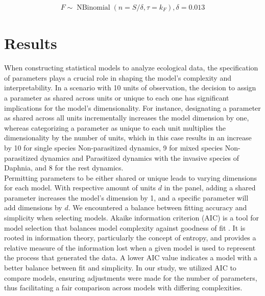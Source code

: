 \documentclass[12pt]{article}
\begin{document}
\begin{align}
F \sim \operatorname{NBinomial}(n=S / \delta, \tau = k_F), \delta=0.013 
\end{align}

\section{Results}
\label{sec:res}
When constructing statistical models to analyze ecological data, the specification of parameters plays a crucial role in shaping the model's complexity and interpretability. In a scenario with 10 units of observation, the decision to assign a parameter as shared across units or unique to each one has significant implications for the model's dimensionality. For instance, designating a parameter as shared across all units incrementally increases the model dimension by one, whereas categorizing a parameter as unique to each unit multiplies the dimensionality by the number of units, which in this case results in an increase by 10 for single species Non-parasitized dynamics, 9 for mixed species Non-parasitized dynamics and Parasitized dynamics with the invasive species of Daphnia, and 8 for the rest dynamics.\\

Permitting parameters to be either shared or unique leads to varying dimensions for each model. With respective amount of units $d$ in the panel, adding a shared parameter increases the model's dimension by 1, and a specific parameter will add dimensions by $d$. We encountered a balance between fitting accuracy and simplicity when selecting models. Akaike information criterion (AIC) is a tool for model selection that balances model complexity against goodness of fit \citep{bozdogan1987model}. It is rooted in information theory, particularly the concept of entropy, and provides a relative measure of the information lost when a given model is used to represent the process that generated the data. A lower AIC value indicates a model with a better balance between fit and simplicity. In our study, we utilized AIC to compare models, ensuring adjustments were made for the number of parameters, thus facilitating a fair comparison across models with differing complexities.\\
\end{document}
